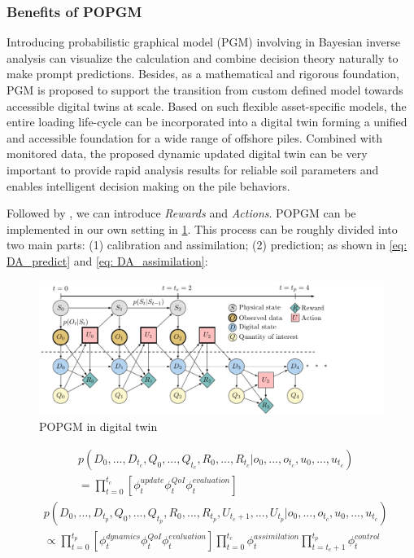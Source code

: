\subsubsection{Benefits of \acrlong{POPGM}}



Introducing probabilistic graphical model (\acrshort{PGM}) involving in Bayesian inverse analysis can visualize the calculation and combine decision theory naturally to make prompt predictions. Besides, as a mathematical and rigorous foundation, \acrshort{PGM} is proposed to support the transition from custom defined model towards accessible digital twins at scale. Based on such flexible asset-specific models, the entire loading life-cycle can be incorporated into a digital twin forming a unified and accessible foundation for a wide range of offshore piles. Combined with monitored data, the proposed dynamic updated digital twin can be very important to provide rapid analysis results for reliable soil parameters and enables intelligent decision making on the pile behaviors. 

 Followed by \cite{kapteyn2021}, we can introduce \textit{Rewards} and \textit{Actions}. \acrfull{POPGM} can be implemented in our own setting in \cref{fig: POMDP}. This process can be roughly divided into two main parts: (1) calibration and assimilation; (2) prediction; as shown in \cref{eq: DA_predict} and \cref{eq: DA_assimilation}:
\begin{figure}[htbp]
    \centering
    \includegraphics[width = 190mm]{Figures/figure-POMDP.pdf}
 \caption{\acrshort{POPGM} in digital twin}
 \label{fig: POMDP}
\end{figure}
\begin{equation}
\begin{aligned}
& p(D_{0},...,D_{t_{c}},Q_{0},...,Q_{t_{c}},R_{0},...,R_{t_{c}}|o_{0},...,o_{t_{c}},u_{0},...,u_{t_{c}}) \\
& = \prod_{t=0}^{t_{c}}[\phi_{t}^{update}\phi_{t}^{QoI}\phi_{t}^{evaluation}] \label{eq: DA_predict}
\end{aligned}
\end{equation}
\begin{equation}
\begin{aligned}
    & p(D_{0},...,D_{t_{p}},Q_{0},...,Q_{t_{p}},R_{0},...,R_{t_{p}},U_{t_{c}+1},...,U_{t_{p}}|o_{0},...,o_{t_{c}},u_{0},...,u_{t_{c}}) \\
    & \propto \prod_{t=0}^{t_{p}}[\phi_{t}^{dynamics}\phi_{t}^{QoI}\phi_{t}^{evaluation}] \prod_{t=0}^{t_{c}}\phi_{t}^{assimilation} \prod_{t=t_{c}+1}^{t_{p}}\phi_{t}^{control} \label{eq: DA_assimilation}
\end{aligned}
\end{equation}


